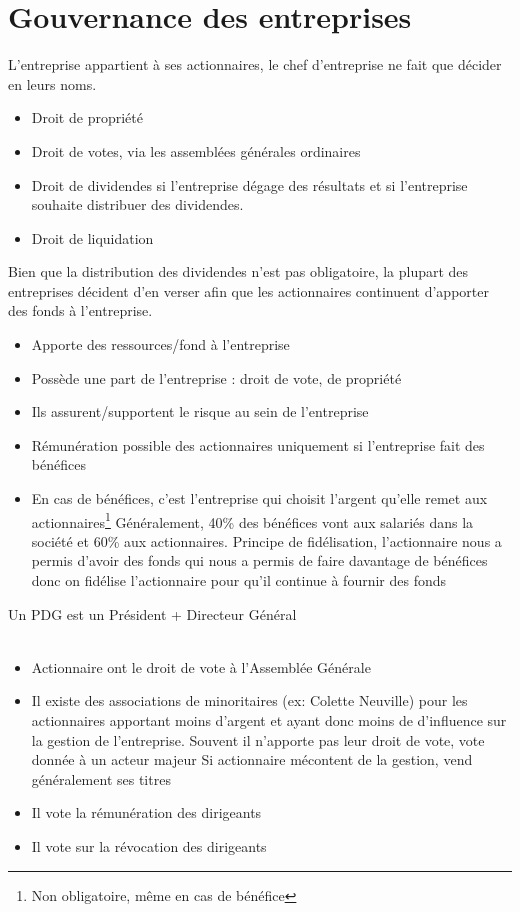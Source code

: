 \chapter{Gouvernance des entreprises}
L'entreprise appartient à ses actionnaires, le chef d'entreprise ne fait que décider en leurs noms.
\begin{itemize}
	\item Droit de propriété
	\item Droit de votes, via les assemblées générales ordinaires
	\item Droit de dividendes si l'entreprise dégage des résultats et si l'entreprise souhaite distribuer des dividendes.
	\item Droit de liquidation
\end{itemize}

\begin{remarque}
	Bien que la distribution des dividendes n'est pas obligatoire, la plupart des entreprises décident d'en
	verser afin que les actionnaires continuent d'apporter des fonds à l'entreprise.
\end{remarque}

\begin{itemize}
	\item Apporte des ressources/fond à l'entreprise
	\item Possède une part de l'entreprise : droit de vote, de propriété
	\item Ils assurent/supportent le risque au sein de l'entreprise
	\item Rémunération possible des actionnaires uniquement si l'entreprise fait des bénéfices
	\item En cas de bénéfices, c'est l'entreprise qui choisit l'argent qu'elle remet aux actionnaires\footnote{Non obligatoire, même en cas de bénéfice}
		Généralement, 40\% des bénéfices vont aux salariés dans la société et 60\% aux actionnaires. 
		Principe de fidélisation, l'actionnaire nous a permis d’avoir des fonds qui nous a permis de faire
		davantage de bénéfices donc on fidélise l'actionnaire pour qu'il continue à fournir des fonds
\end{itemize}

\begin{remarque}
	Un PDG est un Président + Directeur Général\\~
\end{remarque}
\begin{itemize}
	\item Actionnaire ont le droit de vote à l’Assemblée Générale
	\item Il existe des associations de minoritaires (ex: Colette Neuville) pour les actionnaires apportant moins d’argent et ayant donc moins de d’influence sur
		la gestion de l’entreprise. Souvent il n’apporte pas leur droit de vote, vote donnée à un acteur majeur
		Si actionnaire mécontent de la gestion, vend généralement ses titres
	\item Il vote la rémunération des dirigeants
	\item Il vote sur la révocation des dirigeants
\end{itemize}

